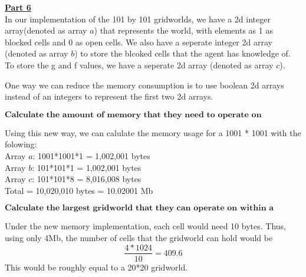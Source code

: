 \documentclass[12pt]{amsart}
\begin{document}
\medskip\noindent\textbf{\underline{Part 6}} \\
In our implementation of the 101 by 101 gridworlds, we have a 2d integer array(denoted as array $a$) that represents the world, with elements as 1 as blocked cells and 0 as open cells. We also have a seperate integer 2d array (denoted as array $b$) to store the blcoked cells that the agent has knowledge of. To store the g and f values, we have a seperate 2d array (denoted as array $c$).

One way we can reduce the memory consumption is to use  boolean 2d arrays instead of an integers to represent the first two 2d arrays.

$\textbf{Calculate the amount of memory that they need to operate on
gridworlds of size 1001*1001}$

Using this new way, we can calulate the memory usage for a 1001 * 1001 with the folowing:
\\Array $a$: 1001*1001*1 = 1,002,001 bytes
\\Array $b$: 101*101*1 = 1,002,001 bytes
\\Array $c$: 101*101*8 = 8,016,008 bytes
\\Total = 10,020,010 bytes = 10.02001 Mb 

$\textbf{Calculate the largest gridworld that they can operate on within a
memory limit of 4 MBytes}$ 

Under the new memory implementation, each cell would need 10 bytes. Thus, using only 4Mb, the number of cells that the gridworld can hold would be
$$ \frac{4*1024}{10} = 409.6$$
This would be roughly equal to a 20*20 gridworld.
\end{document}
